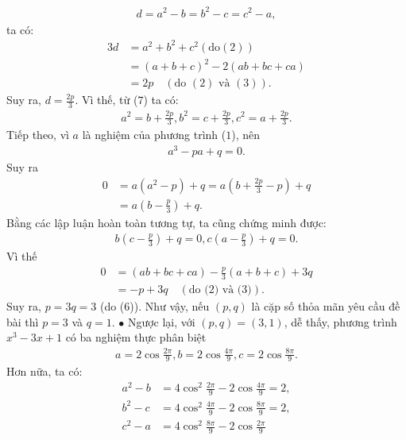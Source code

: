 \begin{multicols}{2}
\begin{align*}
		d = {a^2} - b = {b^2} - c = {c^2} - a, \tag{$7$}
	\end{align*}
	ta có:
	\begin{align*}
			3d &= {a^2} + {b^2} + {c^2}({\text{do}}(2))\\
			 &= {\left( {a + b + c} \right)^2} - 2\left( {ab + bc + ca} \right)\\
			 &= 2p \quad({\text{do }}(2){\text{ và }}(3)).
	\end{align*}
	Suy ra, $d = \frac{{2p}}{3}$. Vì thế, từ ($7$) ta có:
	\begin{align*}
		{a^2} = b + \frac{{2p}}{3}, {b^2} = c + \frac{{2p}}{3}, {c^2} = a + \frac{{2p}}{3}.
	\end{align*}
	Tiếp theo, vì $a$ là nghiệm của phương trình ($1$), nên
	\begin{align*}
		{a^3} - pa + q = 0.
	\end{align*}
	Suy ra
	\begin{align*}
		0 &= a\left( {{a^2} - p} \right) + q = a\left( {b + \frac{{2p}}{3} - p} \right) + q \\
		&= a\left( {b - \frac{p}{3}} \right) + q.
	\end{align*}
	Bằng các lập luận hoàn toàn tương tự, ta cũng chứng minh được:
	\begin{align*}
		b\left( {c - \frac{p}{3}} \right) + q = 0, c\left( {a - \frac{p}{3}} \right) + q = 0.
	\end{align*}
	Vì thế
	\begin{align*}
		0 &= \left( {ab + bc + ca} \right) - \frac{p}{3}\left( {a + b + c} \right) + 3q \\
		&=  - p + 3q \quad(\text{do ($2$) và ($3$)}).
	\end{align*}
	Suy ra, $p = 3q = 3$ (do ($6$)).
	\vskip 0.05cm
	Như vậy, nếu $(p, q)$ là cặp số thỏa mãn yêu cầu đề bài thì $p = 3$ và $q = 1$.
	\vskip 0.05cm
	$\bullet$ Ngược lại, với $(p, q) = (3, 1)$, dễ thấy, phương trình $x^3 - 3x + 1$ có ba nghiệm thực phân biệt
	\begin{align*}
		a = 2\cos \frac{{2\pi }}{9}, b = 2\cos \frac{{4\pi }}{9}, c = 2\cos \frac{{8\pi }}{9}.
	\end{align*}
	Hơn nữa, ta có:
	\begin{align*}
		{a^2} - b &= 4{\cos ^2}\frac{{2\pi }}{9} - 2\cos \frac{{4\pi }}{9} = 2,\\
		{b^2} - c &= 4{\cos ^2}\frac{{4\pi }}{9} - 2\cos \frac{{8\pi }}{9} = 2,\\
		{c^2} - a &= 4{\cos ^2}\frac{{8\pi }}{9} - 2\cos \frac{{2\pi }}{9} \\

\end{align*}
\end{multicols}
